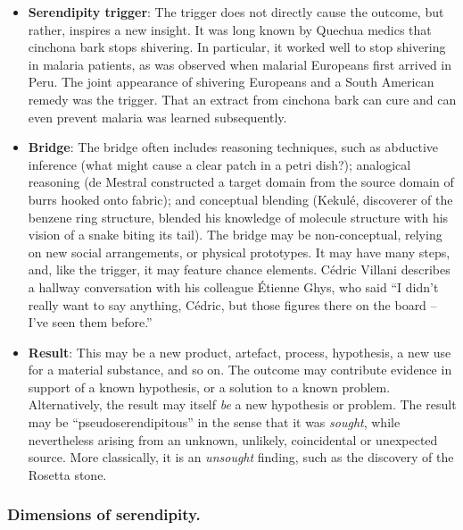 \begin{itemize}
\item \textbf{Serendipity trigger}: The trigger does not directly
  cause the outcome, but rather, inspires a new insight.  It was long
  known by Quechua medics that cinchona bark stops shivering.  In
  particular, it worked well to stop shivering in malaria patients, as
  was observed when malarial Europeans first arrived in Peru.  The
  joint appearance of shivering Europeans and a South American remedy
  was the trigger.  That an extract from cinchona bark can cure and
  can even prevent malaria was learned subsequently.
\end{itemize}

\begin{itemize}
\item \textbf{Bridge}: The bridge often includes reasoning techniques,
  such as abductive inference (what might cause a clear patch in a
  petri dish?); analogical reasoning (de Mestral constructed a target
  domain from the source domain of burrs hooked onto fabric); and
  conceptual blending (Kekul\'e, discoverer of the benzene ring
  structure, blended his knowledge of molecule structure with his
  vision of a snake biting its tail).  The bridge may be
  non-conceptual, relying on new social arrangements, or physical
  prototypes.  It may have many steps, and, like the trigger, it may
  feature chance elements.  C\'edric Villani
  \citeyear[p.~16]{birth-of-a-theorem} describes a hallway
  conversation with his colleague \'Etienne Ghys, who said ``I didn't
  really want to say anything, C\'edric, but those figures there on
  the board -- I've seen them before.''
\end{itemize}

\begin{itemize}
\item \textbf{Result}: This may be a new product, artefact, process,
  hypothesis, a new use for a material substance, and so on.  The
  outcome may contribute evidence in support of a known hypothesis, or
  a solution to a known problem.  Alternatively, the result may itself
  {\em be} a new hypothesis or problem.  The result may be
  ``pseudoserendipitous'' in the sense that it was {\em sought}, while
  nevertheless arising from an unknown, unlikely, coincidental or
  unexpected source.  More classically, it is an \emph{unsought}
  finding, such as the discovery of the Rosetta stone.
\end{itemize}

\subsubsection*{Dimensions of serendipity.}

